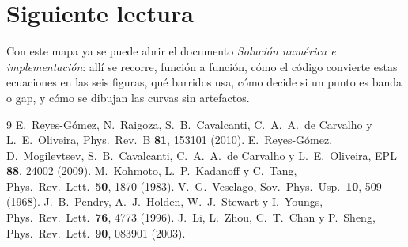 \documentclass[11pt,a4paper]{article}
\begin{document}
\section{Siguiente lectura}

Con este mapa ya se puede abrir el documento
\textit{Solución numérica e implementación}: allí se recorre, función a
función, cómo el código convierte estas ecuaciones en las seis figuras, qué
barridos usa, cómo decide si un punto es banda o gap, y cómo se dibujan las
curvas sin artefactos.

\begin{thebibliography}{9}
E.~Reyes-Gómez, N.~Raigoza, S.~B.~Cavalcanti, C.~A.~A.~de Carvalho y L.~E.~Oliveira,
Phys.\ Rev.\ B \textbf{81}, 153101 (2010).
E.~Reyes-Gómez, D.~Mogilevtsev, S.~B.~Cavalcanti, C.~A.~A.~de Carvalho y L.~E.~Oliveira,
EPL \textbf{88}, 24002 (2009).
M.~Kohmoto, L.~P.~Kadanoff y C.~Tang, Phys.\ Rev.\ Lett.\ \textbf{50}, 1870 (1983).
V.~G.~Veselago, Sov.\ Phys.\ Usp.\ \textbf{10}, 509 (1968).
J.~B.~Pendry, A.~J.~Holden, W.~J.~Stewart y I.~Youngs, Phys.\ Rev.\ Lett.\ \textbf{76}, 4773 (1996).
J.~Li, L.~Zhou, C.~T.~Chan y P.~Sheng, Phys.\ Rev.\ Lett.\ \textbf{90}, 083901 (2003).
\end{thebibliography}
\end{document}
